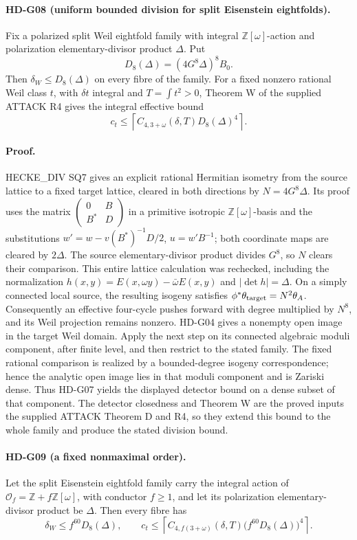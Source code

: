 \paragraph{HD-G08 (uniform bounded division for split Eisenstein eightfolds).}
Fix a polarized split Weil eightfold family with integral
$\mathbb Z[\omega]$-action and polarization elementary-divisor product
$\Delta$. Put
\[
D_8(\Delta)=(4G^8\Delta)^8 B_0.
\]
Then $\delta_W\le D_8(\Delta)$ on every fibre of the family. For a fixed
nonzero rational Weil class $t$, with $\delta t$ integral and
$T=\int t^2>0$, Theorem W of the supplied ATTACK R4 gives the
integral effective bound
\[
c_t\le
\left\lceil C_{4,3+\omega}(\delta,T)D_8(\Delta)^4\right\rceil.
\]

\paragraph{Proof.}
HECKE\_DIV SQ7 gives an explicit rational Hermitian isometry from
the source lattice to a fixed target lattice, cleared in both directions
by $N=4G^8\Delta$. Its proof uses the matrix
$\begin{pmatrix}0&B\\B^*&D\end{pmatrix}$ in a primitive isotropic
$\mathbb Z[\omega]$-basis and the substitutions
$w'=w-v(B^*)^{-1}D/2$, $u=w'B^{-1}$; both coordinate maps are
cleared by $2\Delta$. The source elementary-divisor product divides
$G^8$, so $N$ clears their comparison. This entire lattice calculation
was rechecked, including the normalization
$h(x,y)=E(x,\omega y)-\bar\omega E(x,y)$ and
$|\det h|=\Delta$.
On a simply connected local source, the resulting isogeny satisfies
$\phi^*\theta_{\rm target}=N^2\theta_A$.
Consequently an effective four-cycle pushes forward with degree
multiplied by $N^8$, and its Weil projection remains nonzero.
HD-G04 gives a nonempty open image in the target Weil domain.
Apply the next step on its connected algebraic moduli component, after
finite level, and then restrict to the stated family. The fixed rational
comparison is realized by a bounded-degree isogeny correspondence; hence
the analytic open image lies in that moduli component and is Zariski dense.
Thus HD-G07 yields the displayed detector bound on a dense subset of
that component.
The detector closedness and Theorem W are the proved inputs
the supplied ATTACK Theorem D and R4, so they extend this bound
to the whole family and produce the stated division bound.

\paragraph{HD-G09 (a fixed nonmaximal order).}
Let the split Eisenstein eightfold family carry the integral action of
$\mathcal O_f=\mathbb Z+f\mathbb Z[\omega]$, with conductor $f\ge1$,
and let its polarization elementary-divisor product be $\Delta$.
Then every fibre has
\[
\delta_W\le f^{60}D_8(\Delta),\qquad
c_t\le\left\lceil
C_{4,f(3+\omega)}(\delta,T)
\bigl(f^{60}D_8(\Delta)\bigr)^4\right\rceil.
\]

